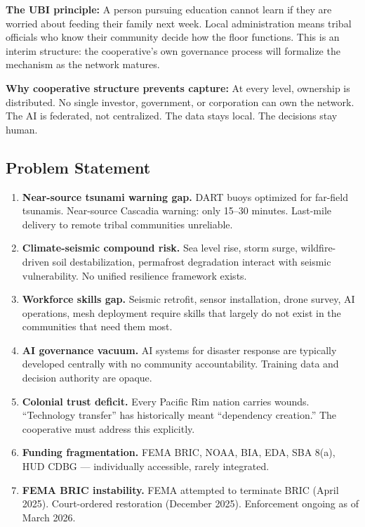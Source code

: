\documentclass[11pt,letterpaper]{article}
\begin{document}
\textbf{The UBI principle:} A person pursuing education cannot learn if they are worried about feeding their family next week. Local administration means tribal officials who know their community decide how the floor functions. This is an interim structure: the cooperative's own governance process will formalize the mechanism as the network matures.

\textbf{Why cooperative structure prevents capture:} At every level, ownership is distributed. No single investor, government, or corporation can own the network. The AI is federated, not centralized. The data stays local. The decisions stay human.

\subsection{Problem Statement}

\begin{enumerate}[label=\textbf{P\arabic*.}, leftmargin=2.5em]
  \item \textbf{Near-source tsunami warning gap.} DART buoys optimized for far-field tsunamis. Near-source Cascadia warning: only 15--30 minutes. Last-mile delivery to remote tribal communities unreliable.
  \item \textbf{Climate-seismic compound risk.} Sea level rise, storm surge, wildfire-driven soil destabilization, permafrost degradation interact with seismic vulnerability. No unified resilience framework exists.
  \item \textbf{Workforce skills gap.} Seismic retrofit, sensor installation, drone survey, AI operations, mesh deployment require skills that largely do not exist in the communities that need them most.
  \item \textbf{AI governance vacuum.} AI systems for disaster response are typically developed centrally with no community accountability. Training data and decision authority are opaque.
  \item \textbf{Colonial trust deficit.} Every Pacific Rim nation carries wounds. ``Technology transfer'' has historically meant ``dependency creation.'' The cooperative must address this explicitly.
  \item \textbf{Funding fragmentation.} FEMA BRIC, NOAA, BIA, EDA, SBA 8(a), HUD CDBG --- individually accessible, rarely integrated.
  \item \textbf{FEMA BRIC instability.} FEMA attempted to terminate BRIC (April 2025). Court-ordered restoration (December 2025). Enforcement ongoing as of March 2026.
\end{enumerate}
\end{document}
